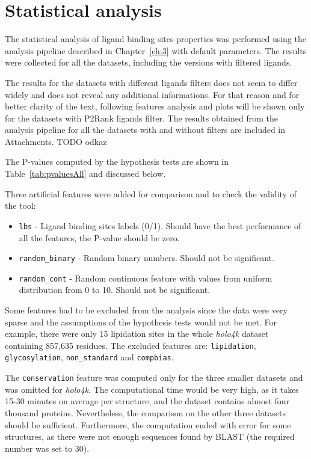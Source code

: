 \newpage
\section{Statistical analysis}

The statistical analysis of ligand binding sites properties was performed using the analysis pipeline described in Chapter~\ref{ch:3} with default parameters. The results were collected for all the datasets, including the versions with filtered ligands.

The results for the datasets with different ligands filters does not seem to differ widely and does not reveal any additional informations. For that reason and for better clarity of the text, following features analysis and plots will be shown only for the datasets with P2Rank ligands filter. The results obtained from the analysis pipeline for all the datasets with and without filters are included in Attachments. TODO odkaz

The P-values computed by the hypothesis tests are shown in Table~\ref{tab:pvaluesAll} and discussed below.

Three artificial features were added for comparison and to check the validity of the tool:
\begin{itemize}
  \item \texttt{lbs} - Ligand binding sites labels (0/1). Should have the best performance of all the features, the P-value should be zero.
  \item \texttt{random\_binary} - Random binary numbers. Should not be significant.
  \item \texttt{random\_cont} - Random continuous feature with values from uniform distribution from 0 to 10. Should not be significant.
\end{itemize}

Some features had to be excluded from the analysis since the data were very sparse and the assumptions of the hypothesis tests would not be met. For example, there were only 15 lipidation sites in the whole \textit{holo4k} dataset containing  857,635 residues. The excluded features are: \texttt{lipidation}, \texttt{glycosylation}, \texttt{non\_standard} and \texttt{compbias}.

The \texttt{conservation} feature was computed only for the three smaller datasets and was omitted for \textit{holo4k}. The computational time would be very high, as it takes 15-30 minutes on average per structure, and the dataset contains almost four thousand proteins. Nevertheless, the comparison on the other three datasets should be sufficient. Furthermore, the computation ended with error for some structures, as there were not enough sequences found by BLAST \cite{blast} (the required number was set to 30).

